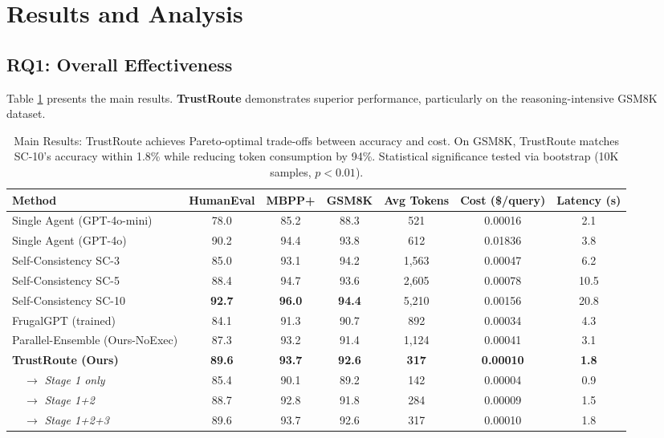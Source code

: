 \documentclass[acmsmall,screen,review,anonymous]{acmart}
\begin{document}
\section{Results and Analysis}

\subsection{RQ1: Overall Effectiveness}
Table \ref{tab:main_results} presents the main results. \textbf{TrustRoute} demonstrates superior performance, particularly on the reasoning-intensive GSM8K dataset.
    
    \begin{table}[t]
    \centering
    \caption{Main Results: TrustRoute achieves Pareto-optimal trade-offs between accuracy and cost. On GSM8K, TrustRoute matches SC-10's accuracy within 1.8\% while reducing token consumption by 94\%. Statistical significance tested via bootstrap (10K samples, $p < 0.01$).}
    \label{tab:main_results}
    \begin{tabular}{lcccccc}
    \toprule
    \textbf{Method} & \textbf{HumanEval} & \textbf{MBPP+} & \textbf{GSM8K} & \textbf{Avg Tokens} & \textbf{Cost (\$/query)} & \textbf{Latency (s)} \\
    \midrule
    Single Agent (GPT-4o-mini) & 78.0 & 85.2 & 88.3 & 521 & 0.00016 & 2.1 \\
    Single Agent (GPT-4o) & 90.2 & 94.4 & 93.8 & 612 & 0.01836 & 3.8 \\
    \midrule
    Self-Consistency SC-3 & 85.0 & 93.1 & 94.2 & 1,563 & 0.00047 & 6.2 \\
    Self-Consistency SC-5 & 88.4 & 94.7 & 93.6 & 2,605 & 0.00078 & 10.5 \\
    Self-Consistency SC-10 & \textbf{92.7} & \textbf{96.0} & \textbf{94.4} & 5,210 & 0.00156 & 20.8 \\
    \midrule
    FrugalGPT (trained) & 84.1 & 91.3 & 90.7 & 892 & 0.00034 & 4.3 \\
    Parallel-Ensemble (Ours-NoExec) & 87.3 & 93.2 & 91.4 & 1,124 & 0.00041 & 3.1 \\
    \midrule
    \textbf{TrustRoute (Ours)} & \textbf{89.6} & \textbf{93.7} & \textbf{92.6} & \textbf{317} & \textbf{0.00010} & \textbf{1.8} \\
    ~~$\rightarrow$ \textit{Stage 1 only} & 85.4 & 90.1 & 89.2 & 142 & 0.00004 & 0.9 \\
    ~~$\rightarrow$ \textit{Stage 1+2} & 88.7 & 92.8 & 91.8 & 284 & 0.00009 & 1.5 \\
    ~~$\rightarrow$ \textit{Stage 1+2+3} & 89.6 & 93.7 & 92.6 & 317 & 0.00010 & 1.8 \\
    \bottomrule
    \end{tabular}
    \end{table}
\end{document}
